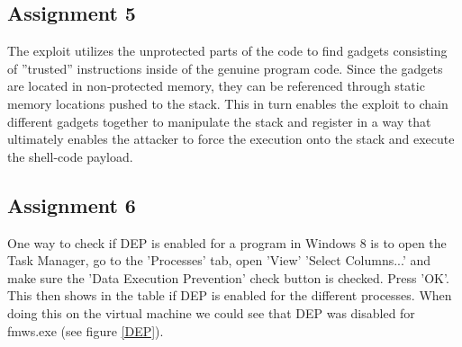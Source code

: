 \documentclass[10pt]{article}
\newcommand{\escape}[1]{\PVerb{#1}}
\begin{document}



    \subsection{Assignment 5}

      The exploit utilizes the unprotected parts of the code to find
      gadgets consisting of ''trusted'' instructions inside of the genuine
      program code. Since the gadgets are located in non-protected memory, they
      can be referenced through static memory locations pushed to the stack.
      This in turn enables the exploit to chain different gadgets together to
      manipulate the stack and register in a way that ultimately enables the
      attacker to force the execution onto the stack and execute the shell-code
      payload.

    \subsection{Assignment 6}
One way to check if DEP is enabled for a program in Windows 8 is to open the Task Manager, go to the 'Processes' tab, open 'View' \escape{>} 'Select Columns...' and make sure the 'Data Execution Prevention' check button is checked. Press 'OK'. This then shows in the table if DEP is enabled for the different processes. When doing this on the virtual machine we could see that DEP was disabled for fmws.exe (see figure \ref{DEP}).
\end{document}
